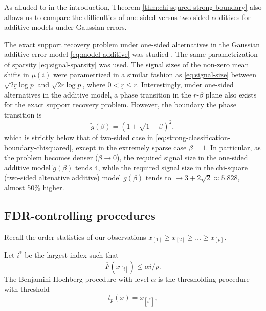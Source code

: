 As alluded to in the introduction, Theorem \ref{thm:chi-squred-strong-boundary} also allows us to compare the difficulties of one-sided versus two-sided additives for additive models under Gaussian errors.

\begin{remark}
The exact support recovery problem under one-sided alternatives in the Gaussian additive error model \eqref{eq:model-additive} was studied \cite{gao2018fundamental}.
The same parametrization of sparsity \eqref{eq:signal-sparsity} was used.
The signal sizes of the non-zero mean shifts in $\mu(i)$ were parametrized in a similar fashion as \eqref{eq:signal-size} between $\sqrt{2\underline{r}\log{p}}$ and $\sqrt{2\overline{r}\log{p}}$, where $0<\underline{r}\le\overline{r}$.
Interestingly, under one-sided alternatives in the additive model, a phase transition in the $r$-$\beta$ plane also exists for the exact support recovery problem.
However, the boundary the phase transition is
\begin{equation} \label{eq:strong-classification-boundary-additive}
    \widetilde{g}(\beta) = \left(1 + \sqrt{1-\beta}\right)^2,
\end{equation}
which is strictly below that of two-sided case in \eqref{eq:strong-classification-boundary-chisquared}, except in the extremely sparse case $\beta = 1$.
In particular, as the problem becomes denser ($\beta\to0$), the required signal size in the one-sided additive model $\widetilde{g}(\beta)$ tends $4$, while the required signal size in the chi-square (two-sided altenative additive) model ${g}(\beta)$ tends to $\to3+2\sqrt{2}\approx 5.828$, almost 50\% higher.
\end{remark}

\subsection{FDR-controlling procedures}
\label{subsec:FDR-controlling-procedures}

Recall the order statistics of our observations $x_{[1]} \ge x_{[2]}  \ge \ldots \ge x_{[p]}$.

\begin{definition}
Let $i^*$ be the largest index such that
$$
\overline{F}(x_{[i]}) \le \alpha i/p.
$$
The Benjamini-Hochberg procedure with level $\alpha$ is the thresholding procedure with threshold
\begin{equation} \label{eq:BH-procedure}
    t_p(x) = x_{[i^*]},
\end{equation}
\end{definition}

